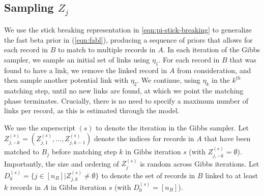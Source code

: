\documentclass[12pt,letterpaper]{article}
\newcommand{\1}[1]{\mathbb{I}\!\left[#1\right]} %
\begin{document}

\subsection{Sampling $Z_j$} \label{sec:sequential-sampler} 

We use the stick breaking representation in \eqref{eqn:pi-stick-breaking} to generalize the fast beta prior in (\ref{eqn:fabl}), producing a sequence of priors that allows for each record in $B$ to match to multiple records in $A$. In each iteration of the Gibbs sampler, we sample an initial set of links using $\eta_1$. For each record in $B$ that was found to have a link, we remove the linked record in $A$ from consideration, and then sample another potential link with $\eta_2$. We continue, using $\eta_k$ in the $k^{th}$ matching step, until no new links are found, at which we point the matching phase terminates. Crucially, there is no need to specify a maximum number of links per record, as this is estimated through the model. 


We use the superscript $(s)$ to denote the iteration in the Gibbs sampler. Let $Z_{j, -k}^{(s)} = (Z_{j, 1}^{(s)}, \ldots, Z_{j, k-1}^{(s)})$ denote the indices for records in $A$ that have been matched to $B_j$ before matching step $k$ in Gibbs iteration $s$ (with $Z_{j, -k}^{(s)} = \emptyset$). Importantly, the size and ordering of $Z_j^{(s)}$ is random across Gibbs iterations. Let $D_k^{(s)} = \{j \in [n_B]| Z_{j, k}^{(s)} \neq \emptyset\}$ to denote the set of records in $B$ linked to at least $k$ records in $A$ in Gibbs iteration $s$ (with $D_0^{(s)} = [n_B]$).  
\end{document}
